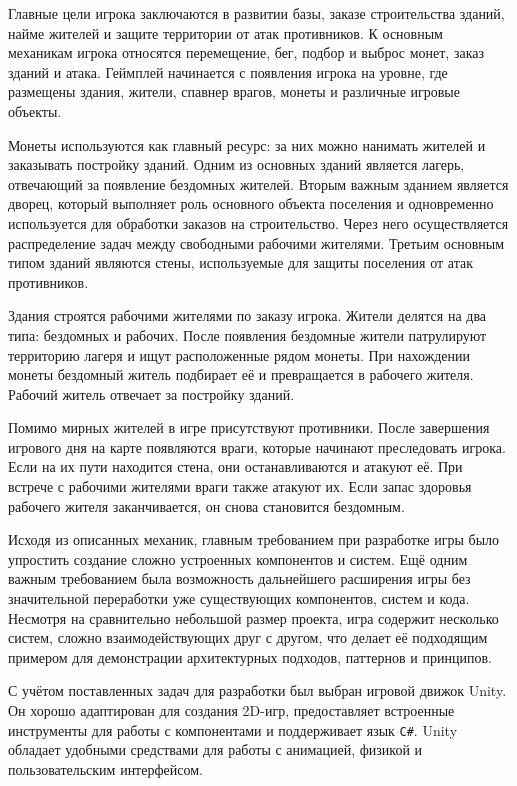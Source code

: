 \documentclass[a4paper,12pt]{report}
\begin{document}
Главные цели игрока заключаются в развитии базы, заказе строительства зданий, найме жителей и защите территории от атак противников. К основным механикам игрока относятся перемещение, бег, подбор и выброс монет, заказ зданий и атака. Геймплей начинается с появления игрока на уровне, где размещены здания, жители, спавнер врагов, монеты и различные игровые объекты.

Монеты используются как главный ресурс: за них можно нанимать жителей и заказывать постройку зданий. Одним из основных зданий является лагерь, отвечающий за появление бездомных жителей. Вторым важным зданием является дворец, который выполняет роль основного объекта поселения и одновременно используется для обработки заказов на строительство. Через него осуществляется распределение задач между свободными рабочими жителями. Третьим основным типом зданий являются стены, используемые для защиты поселения от атак противников.

Здания строятся рабочими жителями по заказу игрока. Жители делятся на два типа: бездомных и рабочих. После появления бездомные жители патрулируют территорию лагеря и ищут расположенные рядом монеты. При нахождении монеты бездомный житель подбирает её и превращается в рабочего жителя. Рабочий житель отвечает за постройку зданий.

Помимо мирных жителей в игре присутствуют противники. После завершения игрового дня на карте появляются враги, которые начинают преследовать игрока. Если на их пути находится стена, они останавливаются и атакуют её. При встрече с рабочими жителями враги также атакуют их. Если запас здоровья рабочего жителя заканчивается, он снова становится бездомным.

Исходя из описанных механик, главным требованием при разработке игры было упростить создание сложно устроенных компонентов и систем. Ещё одним важным требованием была возможность дальнейшего расширения игры без значительной переработки уже существующих компонентов, систем и кода. Несмотря на сравнительно небольшой размер проекта, игра содержит несколько систем, сложно взаимодействующих друг с другом, что делает её подходящим примером для демонстрации архитектурных подходов, паттернов и принципов.

С учётом поставленных задач для разработки был выбран игровой движок Unity. Он хорошо адаптирован для создания 2D-игр, предоставляет встроенные инструменты для работы с компонентами и поддерживает язык \texttt{C\#}. Unity обладает удобными средствами для работы с анимацией, физикой и пользовательским интерфейсом.
\end{document}
